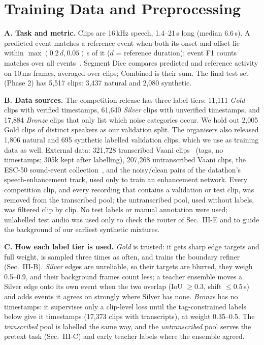 \documentclass[conference]{IEEEtran}
\begin{document}
\section{Training Data and Preprocessing}
\textbf{A. Task and metric.}
Clips are 16\,kHz speech, 1.4--21\,s long (median 6.6\,s).
A predicted event matches a reference event when both its onset and offset lie within $\max(0.2\,d, 0.05)$\,s of it ($d$ = reference duration); event F1 counts matches over all events~\cite{mesaros}.
Segment Dice compares predicted and reference activity on 10\,ms frames, averaged over clips; Combined is their sum.
The final test set (Phase 2) has 5,517 clips: 3,437 natural and 2,080 synthetic.

\textbf{B. Data sources.}
The competition release has three label tiers: 11,111 \emph{Gold} clips with verified timestamps, 61,640 \emph{Silver} clips with unverified timestamps, and 17,884 \emph{Bronze} clips that only list which noise categories occur.
We hold out 2,005 Gold clips of distinct speakers as our validation split.
The organisers also released 1,806 natural and 695 synthetic labelled validation clips, which we use as training data as well.
External data: 321,728 transcribed Vaani clips~\cite{vaani} (tags, no timestamps; 305k kept after labelling), 207,268 untranscribed Vaani clips, the ESC-50 sound-event collection~\cite{esc50}, and the noisy/clean pairs of the datathon's speech-enhancement track, used only to train an enhancement network.
Every competition clip, and every recording that contains a validation or test clip, was removed from the transcribed pool; the untranscribed pool, used without labels, was filtered clip by clip.
No test labels or manual annotation were used; unlabelled test audio was used only to check the router of Sec.~III-E and to guide the background of our earliest synthetic mixtures.

\textbf{C. How each label tier is used.}
\emph{Gold} is trusted: it gets sharp edge targets and full weight, is sampled three times as often, and trains the boundary refiner (Sec.~III-B).
\emph{Silver} edges are unreliable, so their targets are blurred, they weigh 0.5--0.9, and their background frames count less; a teacher ensemble moves a Silver edge onto its own event when the two overlap (IoU $\geq$0.3, shift $\leq$0.5\,s) and adds events it agrees on strongly where Silver has none.
\emph{Bronze} has no timestamps: it supervises only a clip-level loss until the tag-constrained labels below give it timestamps (17,373 clips with transcripts), at weight 0.35--0.5.
The \emph{transcribed} pool is labelled the same way, and the \emph{untranscribed} pool serves the pretext task (Sec.~III-C) and early teacher labels where the ensemble agreed.
\end{document}
